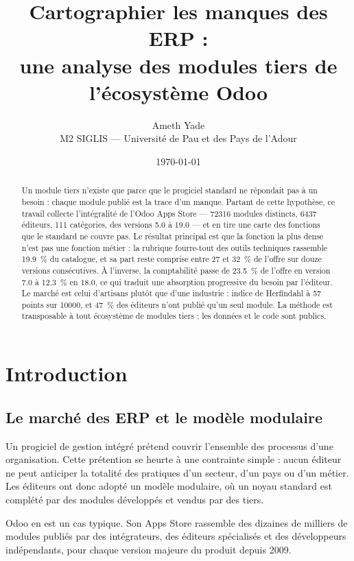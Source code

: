 \documentclass[11pt,a4paper]{article}
\title{Cartographier les manques des ERP :\\
       une analyse des modules tiers de l'écosystème Odoo}
\author{Ameth Yade \\
        \small M2 SIGLIS --- Université de Pau et des Pays de l'Adour}
\date{\today}
\begin{document}
\maketitle

\begin{abstract}
Un module tiers n'existe que parce que le progiciel standard ne répondait pas à
un besoin : chaque module publié est la trace d'un manque. Partant de cette
hypothèse, ce travail collecte l'intégralité de l'Odoo Apps Store ---
\num{72316} modules distincts, \num{6437} éditeurs, \num{111} catégories, des
versions 5.0 à 19.0 --- et en tire une carte des fonctions que le standard ne
couvre pas. Le résultat principal est que la fonction la plus dense n'est pas
une fonction métier : la rubrique fourre-tout des outils techniques rassemble
\SI{19.9}{\percent} du catalogue, et sa part reste comprise entre \num{27} et
\SI{32}{\percent} de l'offre sur douze versions consécutives. À l'inverse, la
comptabilité passe de \SI{23.5}{\percent} de l'offre en version 7.0 à
\SI{12.3}{\percent} en 18.0, ce qui traduit une absorption progressive du besoin
par l'éditeur. Le marché est celui d'artisans plutôt que d'une industrie :
indice de Herfindahl à \num{57} points sur \num{10000}, et \SI{47}{\percent} des
éditeurs n'ont publié qu'un seul module. La méthode est transposable à tout
écosystème de modules tiers ; les données et le code sont publics.
\end{abstract}

\tableofcontents
\newpage

\section{Introduction}

\subsection{Le marché des ERP et le modèle modulaire}

Un progiciel de gestion intégré prétend couvrir l'ensemble des processus d'une
organisation. Cette prétention se heurte à une contrainte simple : aucun éditeur
ne peut anticiper la totalité des pratiques d'un secteur, d'un pays ou d'un
métier. Les éditeurs ont donc adopté un modèle modulaire, où un noyau standard
est complété par des modules développés et vendus par des tiers.

Odoo en est un cas typique. Son Apps Store rassemble des dizaines de milliers de
modules publiés par des intégrateurs, des éditeurs spécialisés et des
développeurs indépendants, pour chaque version majeure du produit depuis 2009.
\end{document}
